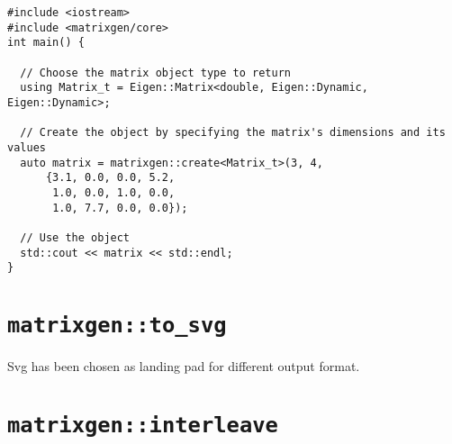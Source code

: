 
    \begin{verbatim}
#include <iostream>
#include <matrixgen/core>
int main() {

  // Choose the matrix object type to return
  using Matrix_t = Eigen::Matrix<double, Eigen::Dynamic, Eigen::Dynamic>;

  // Create the object by specifying the matrix's dimensions and its values
  auto matrix = matrixgen::create<Matrix_t>(3, 4,
      {3.1, 0.0, 0.0, 5.2,
       1.0, 0.0, 1.0, 0.0,
       1.0, 7.7, 0.0, 0.0});

  // Use the object
  std::cout << matrix << std::endl;
}
    \end{verbatim}

  \section{\texttt{matrixgen::to\_svg}}

    Svg has been chosen as landing pad for different output format.


  \section{\texttt{matrixgen::interleave}}

